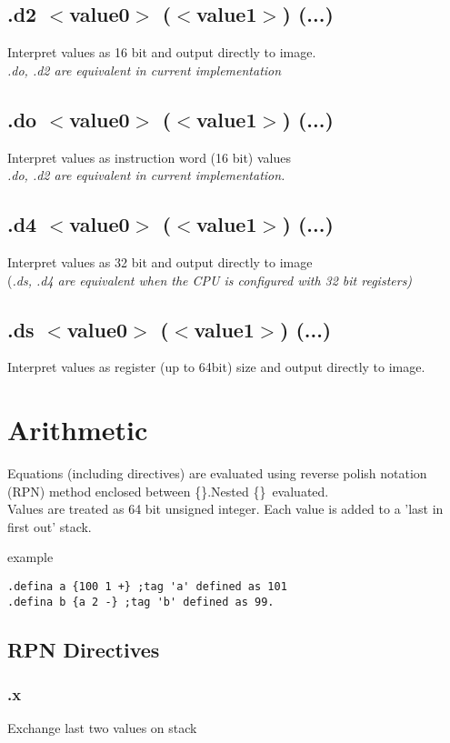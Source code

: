 \documentclass[a4paper,11pt]{article}
\begin{document}
\subsection{.d2 $<$value0$>$ ($<$value1$>$) (...)} 
Interpret values as 16 bit and output directly to image.\\
 \sl .do, .d2 \rm are equivalent in current implementation

\subsection{.do $<$value0$>$ ($<$value1$>$) (...)} 
Interpret values as instruction word (16 bit) values\\
 \sl .do, .d2 \rm are equivalent in current implementation.

\subsection{.d4 $<$value0$>$ ($<$value1$>$) (...)}
Interpret values as 32 bit and output directly to image\\
 (\sl .ds, .d4 \rm are equivalent when the CPU is configured with 32 bit registers)

\subsection{.ds $<$value0$>$ ($<$value1$>$) (...)}
Interpret values as register (up to 64bit) size and output directly to image. 
 
\pagebreak
\section{Arithmetic}
Equations (including directives) are evaluated using reverse polish notation (RPN) method enclosed between \{\}.Nested \{\}\ evaluated.\\
Values are treated as 64 bit unsigned integer. Each value is added to a 'last in first out' stack.

example
\begin{verbatim}
.defina a {100 1 +} ;tag 'a' defined as 101
.defina b {a 2 -} ;tag 'b' defined as 99.
\end{verbatim}

\subsection{RPN Directives}

\subsubsection{.x} 
 Exchange last two values on stack
\end{document}
